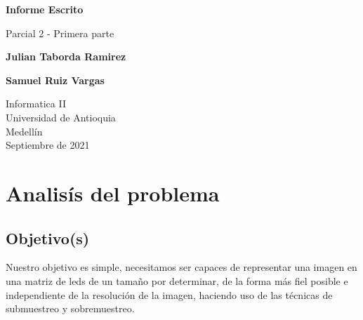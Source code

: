 \documentclass{article}
\begin{document}
\begin{titlepage}
    \begin{center}
        \vspace*{1cm}
            
        \Huge
        \textbf{Informe Escrito}
            
        \vspace{0.5cm}
        \LARGE
        Parcial 2 - Primera parte
            
        \vspace{1.5cm}
            
        \textbf{Julian Taborda Ramirez}
        
        \vspace{0.5cm}
        
        \textbf{Samuel Ruiz Vargas}
            
        \vfill
            
        \vspace{0.8cm}
            
        \Large
        Informatica II\\
        Universidad de Antioquia\\
        Medellín\\
        Septiembre de 2021
            
    \end{center}
\end{titlepage}

\tableofcontents
\vspace*{1.2cm}

\newpage

\section{Analisís del problema}
\label{analisis}

    \begin{flushleft}
    \subsection{Objetivo(s)}
    Nuestro objetivo es simple, necesitamos ser capaces de representar una imagen en una matriz de leds de un tamaño por determinar, de la forma más fiel posible e independiente de la resolución de la imagen, haciendo uso de las técnicas de submuestreo y sobremuestreo. 
    \end{flushleft}
    
    \vspace*{0.5cm}
    
\end{document}
